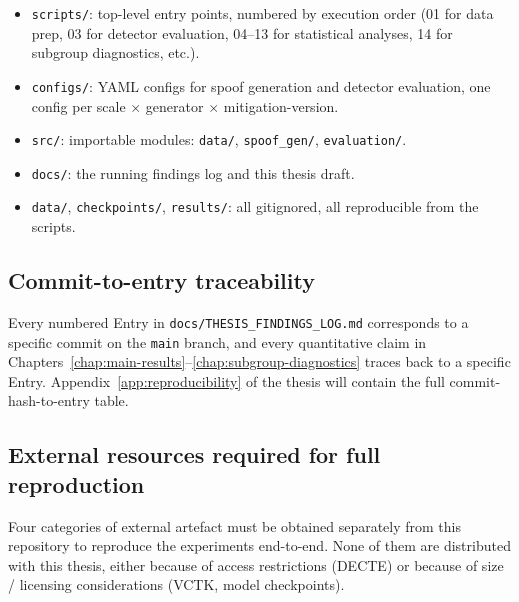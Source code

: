 \begin{itemize}
    \item \texttt{scripts/}: top-level entry points, numbered by execution order
        (01 for data prep, 03 for detector evaluation, 04--13 for
        statistical analyses, 14 for subgroup diagnostics, etc.).
    \item \texttt{configs/}: YAML configs for spoof generation and detector
        evaluation, one config per scale $\times$ generator $\times$ mitigation-version.
    \item \texttt{src/}: importable modules: \texttt{data/}, \texttt{spoof\_gen/}, \texttt{evaluation/}.
    \item \texttt{docs/}: the running findings log and this thesis draft.
    \item \texttt{data/}, \texttt{checkpoints/}, \texttt{results/}: all gitignored, all
        reproducible from the scripts.
\end{itemize}

\subsection{Commit-to-entry traceability}
\label{sec:methodology-repro-traceability}

Every numbered Entry in \texttt{docs/THESIS\_FINDINGS\_LOG.md}
corresponds to a specific commit on the \texttt{main} branch, and
every quantitative claim in Chapters~\ref{chap:main-results}--\ref{chap:subgroup-diagnostics}
traces back to a specific Entry. Appendix~\ref{app:reproducibility}
of the thesis will contain the full commit-hash-to-entry table.

\subsection{External resources required for full reproduction}
\label{sec:methodology-repro-external}

Four categories of external artefact must be obtained separately
from this repository to reproduce the experiments end-to-end. None
of them are distributed with this thesis, either because of access
restrictions (DECTE) or because of size / licensing considerations
(VCTK, model checkpoints).

